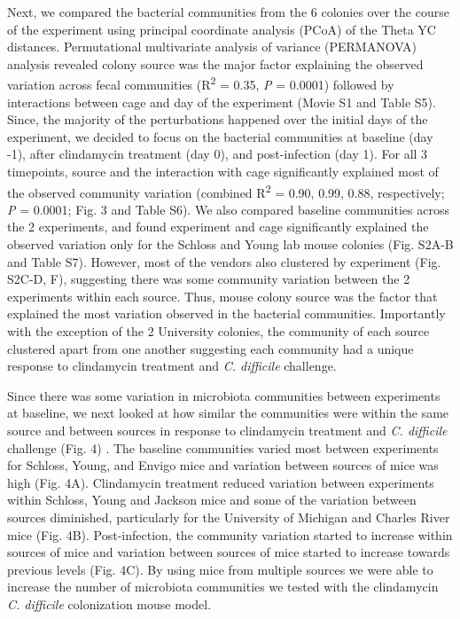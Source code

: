 \documentclass[11pt,]{article}
\begin{document}
Next, we compared the bacterial communities from the 6 colonies over the
course of the experiment using principal coordinate analysis (PCoA) of
the Theta YC distances. Permutational multivariate analysis of variance
(PERMANOVA) analysis revealed colony source was the major factor
explaining the observed variation across fecal communities
(R\textsuperscript{2} = 0.35, \emph{P} = 0.0001) followed by
interactions between cage and day of the experiment (Movie S1 and Table
S5). Since, the majority of the perturbations happened over the initial
days of the experiment, we decided to focus on the bacterial communities
at baseline (day -1), after clindamycin treatment (day 0), and
post-infection (day 1). For all 3 timepoints, source and the interaction
with cage significantly explained most of the observed community
variation (combined R\textsuperscript{2} = 0.90, 0.99, 0.88,
respectively; \emph{P} = 0.0001; Fig. 3 and Table S6). We also compared
baseline communities across the 2 experiments, and found experiment and
cage significantly explained the observed variation only for the Schloss
and Young lab mouse colonies (Fig. S2A-B and Table S7). However, most of
the vendors also clustered by experiment (Fig. S2C-D, F), suggesting
there was some community variation between the 2 experiments within each
source. Thus, mouse colony source was the factor that explained the most
variation observed in the bacterial communities. Importantly with the
exception of the 2 University colonies, the community of each source
clustered apart from one another suggesting each community had a unique
response to clindamycin treatment and \emph{C. difficile} challenge.

Since there was some variation in microbiota communities between
experiments at baseline, we next looked at how similar the communities
were within the same source and between sources in response to
clindamycin treatment and \emph{C. difficile} challenge (Fig. 4) . The
baseline communities varied most between experiments for Schloss, Young,
and Envigo mice and variation between sources of mice was high (Fig.
4A). Clindamycin treatment reduced variation between experiments within
Schloss, Young and Jackson mice and some of the variation between
sources diminished, particularly for the University of Michigan and
Charles River mice (Fig. 4B). Post-infection, the community variation
started to increase within sources of mice and variation between sources
of mice started to increase towards previous levels (Fig. 4C). By using
mice from multiple sources we were able to increase the number of
microbiota communities we tested with the clindamycin \emph{C.
difficile} colonization mouse model.
\end{document}
